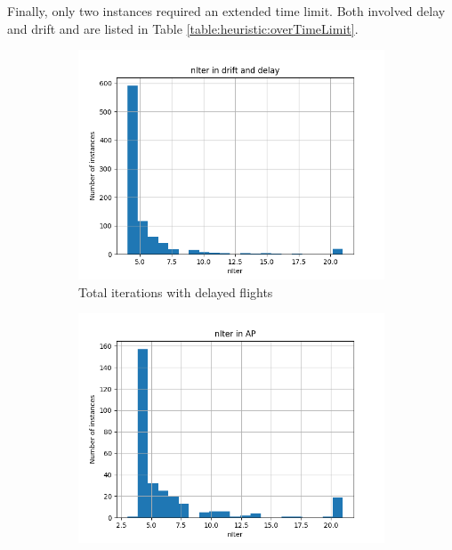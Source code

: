 \documentclass[../../thesis.tex]{subfiles}
\begin{document}
Finally, only two instances required an extended time limit. Both involved delay and drift and are listed in Table \ref{table:heuristic:overTimeLimit}.

\begin{figure}[ht]
    \centering
    \begin{subfigure}{0.3\textwidth}
        \centering
        \includegraphics[width=\linewidth]{thesis/picture/heuristic/nIter_histogram_DD.png}
        \caption{Total iterations with delayed flights}
        \label{fig:heurDD:nIter}
    \end{subfigure}
    \hfill
    \begin{subfigure}{0.3\textwidth}
        \centering
        \includegraphics[width=\linewidth]{thesis/picture/heuristic/nIter_histogram_AP.png}

\end{subfigure}
\end{figure}
\end{document}
